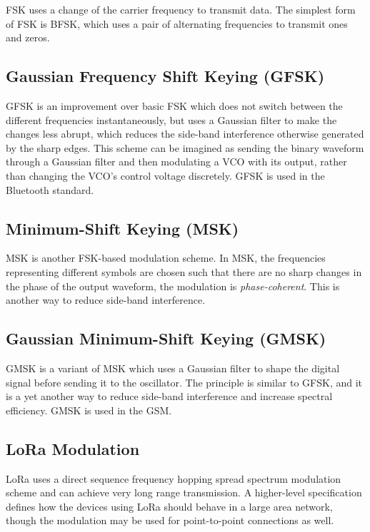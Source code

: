\Gls{FSK} uses a change of the carrier frequency to transmit data. The simplest form of \gls{FSK} is \gls{BFSK}, which uses a pair of alternating frequencies to transmit ones and zeros.

\subsection{Gaussian Frequency Shift Keying (GFSK)}

\Gls{GFSK} is an improvement over basic \gls{FSK} which does not switch between the different frequencies instantaneously, but uses a Gaussian filter to make the changes less abrupt, which reduces the side-band interference otherwise generated by the sharp edges. This scheme can be imagined as sending the binary waveform through a Gaussian filter and then modulating a \gls{VCO} with its output, rather than changing the \gls{VCO}'s control voltage discretely. \Gls{GFSK} is used in the Bluetooth standard.

\subsection{Minimum-Shift Keying (MSK)}

\Gls{MSK} is another \gls{FSK}-based modulation scheme. In \gls{MSK}, the frequencies representing different symbols are chosen such that there are no sharp changes in the phase of the output waveform, the modulation is \textit{phase-coherent}. This is another way to reduce side-band interference.

\subsection{Gaussian Minimum-Shift Keying (GMSK)}

\Gls{GMSK} is a variant of \gls{MSK} which uses a Gaussian filter to shape the digital signal before sending it to the oscillator. The principle is similar to \gls{GFSK}, and it is a yet another way to reduce side-band interference and increase spectral efficiency. \gls{GMSK} is used in the \gls{GSM}.

\subsection{LoRa Modulation}

LoRa uses a direct sequence frequency hopping spread spectrum modulation scheme and can achieve very long range transmission. A higher-level specification defines how the devices using LoRa should behave in a large area network, though the modulation may be used for point-to-point connections as well.

